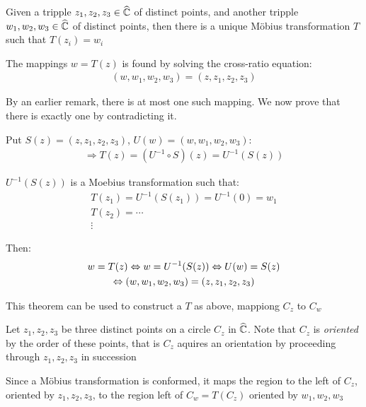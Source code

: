 \begin{theo}[]{}
  Given a tripple $z_1,z_2,z_3\in\widehat{\mathbb{C}}$ of distinct points, and another tripple $w_1,w_2,w_3\in\widehat{\mathbb{C}}$ of distinct points, then there is a unique Möbius transformation $T$ such that $T(z_i) = w_i$
  \par\bigskip
  \noindent The mappings $w = T(z)$ is found by solving the cross-ratio equation:
  \begin{equation*}
    \begin{gathered}
      (w,w_1,w_2,w_3) = (z,z_1,z_2,z_3)
    \end{gathered}
  \end{equation*}
\end{theo}
\par\bigskip
\begin{prf}[]{}
  By an earlier remark, there is at most one such mapping. We now prove that there is exactly one by contradicting it.
  \par\bigskip
  \noindent Put $S(z) = (z,z_1,z_2,z_3)$, $U(w) = (w,w_1,w_2,w_3)$:
  \begin{equation*}
    \begin{gathered}
      \Rightarrow T(z) = (U^{-1}\circ S)(z) = U^{-1}(S(z))
    \end{gathered}
  \end{equation*}\par
  \noindent $U^{-1}(S(z))$ is a Moebius transformation such that:
  \begin{equation*}
    \begin{gathered}
      T(z_1) = U^{-1}(S(z_1)) = U^{-1}(0) = w_1\\
      T(z_2)= \cdots\\
      \vdots
    \end{gathered}
  \end{equation*}
  \par
  \noindent Then:
  \begin{equation*}
    \begin{gathered}
      w = T(z) \Leftrightarrow w = U^{-1}(S(z))\Leftrightarrow U(w) =S(z)\\
      \Leftrightarrow (w,w_1,w_2,w_3) = (z,z_1,z_2,z_3)
    \end{gathered}
  \end{equation*}
\end{prf}
\par\bigskip
\noindent This theorem can be used to construct a $T$ as above, mappiong $C_z$ to $C_w$
\par\bigskip
\noindent Let $z_1,z_2,z_3$ be three distinct points on a circle $C_z$ in $\widehat{\mathbb{C}}$. Note that $C_z$ is \textit{oriented} by the order of these points, that is $C_z$ aquires an orientation by proceeding through $z_1,z_2,z_3$ in succession
\par\bigskip
\noindent Since a Möbius transformation is conformed, it maps the region to the left of $C_z$, oriented by $z_1,z_2,z_3$, to the region left of $C_w = T(C_z)$  oriented by $w_1,w_2,w_3$
\par\bigskip
